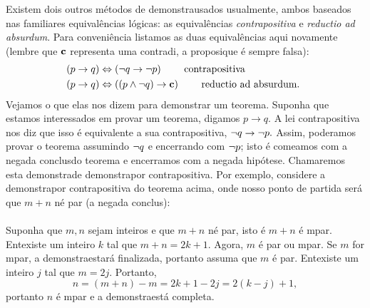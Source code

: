 Existem dois outros m\'etodos de demonstra\cao usados usualmente, ambos baseados nas familiares equival\^encias l\'ogicas: as equival\^encias \emph{contrapositiva} e \emph{reductio ad absurdum}. Para conveni\^encia listamos as duas equival\^encias aqui novamente (lembre que ${\bf c}$ representa uma contradi\caoi, a proposi\cao que \'e sempre falsa):
\begin{eqnarray*}
&(p\to q)\Leftrightarrow(\lnot q \to \lnot p) \quad\quad \textrm{ contrapositiva }\\
&(p\to q)\Leftrightarrow((p\wedge\lnot q)\to {\bf c})\quad\quad \textrm{ reductio ad absurdum. }
\end{eqnarray*} 
Vejamos o que elas nos dizem para demonstrar um teorema. Suponha que estamos interessados em provar um teorema, digamos $p\to q$. A lei contrapositiva nos diz que isso \'e equivalente a sua contrapositiva, $\lnot q\to\lnot p.$ Assim, poder\ih amos provar o teorema assumindo $\lnot q$ e encerrando com $\lnot p$; isto \'e come\cc amos com a nega\cao da conclus\ao do teorema e encerramos com a nega\cao da hip\'otese. Chamaremos esta demonstra\cao de demonstra\cao por contrapositiva. Por exemplo, considere a demonstra\cao por contrapositiva do teorema acima, onde nosso ponto de partida ser\'a que $m+n$ n\ao \'e par (a nega\cao da conclus\aoi): 
\\
\\
{\demo} Suponha que $m,n$ sejam inteiros e que $m+n$ n\ao \'e par, isto \'e $m+n$ \'e \ih mpar. Ent\ao existe um inteiro $k$ tal que $m+n=2k+1$. Agora, $m$ \'e par ou \ih mpar. Se $m$ for \ih mpar, a demonstra\cao estar\'a finalizada, portanto assuma que $m$ \'e par. Ent\ao existe um inteiro $j$ tal que $m=2j$. Portanto,
\[
n=(m+n)-m=2k+1-2j=2(k-j)+1,
\] 
portanto $n$ \'e \ih mpar e a demonstra\cao est\'a completa.  \fim

